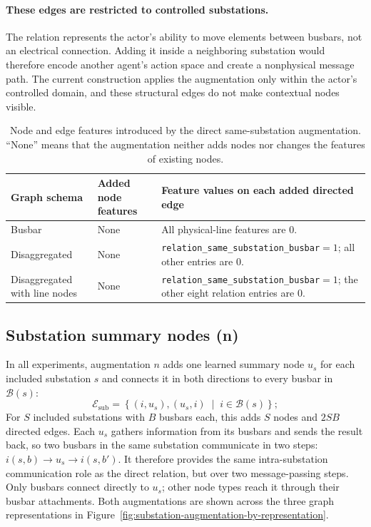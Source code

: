 {\color{clarif}
\paragraph{These edges are restricted to controlled substations.}
The relation represents the actor's ability to move elements between busbars,
not an electrical connection. Adding it inside a neighboring substation would
therefore encode another agent's action space and create a nonphysical message
path. The current construction applies the augmentation only within the actor's
controlled domain, and these structural edges do not make contextual nodes
visible.
}

\begin{table}[H]
  \centering
  \small
  \caption{Node and edge features introduced by the direct same-substation
  augmentation. ``None'' means that the augmentation neither adds nodes nor
  changes the features of existing nodes.}
  \label{tab:same-substation-augmentation-features}
  \setlength{\tabcolsep}{4pt}
  \begin{tabular}{L{0.20\textwidth}L{0.16\textwidth}L{0.54\textwidth}}
    \toprule
    Graph schema & Added node features & Feature values on each added directed edge \\
    \midrule
    Busbar & None & All physical-line features are $0$. \\
    Disaggregated & None & \texttt{relation\_same\_substation\_busbar}$=1$; all other entries are $0$. \\
    Disaggregated with line nodes & None & \texttt{relation\_same\_substation\_busbar}$=1$; the other eight relation entries are $0$. \\
    \bottomrule
  \end{tabular}
\end{table}

\subsection{Substation summary nodes (n)}
\label{sec:substation-summary-nodes}

In all experiments, augmentation $n$ adds one learned summary node $u_s$ for
each included substation $s$ and connects it in both directions to every busbar
in $\mathcal{B}(s)$:
\begin{equation}
  \mathcal{E}_{\mathrm{sub}} =
  \left\{
    (i,u_s),(u_s,i)
    \;\middle|\;
    i\in\mathcal{B}(s)
  \right\};
  \label{eq:substation-node-edges}
\end{equation}
For $S$ included substations with $B$ busbars each, this adds $S$ nodes and
$2SB$ directed edges. Each $u_s$ gathers information from its busbars and sends
the result back, so two busbars in the same substation communicate in two steps:
$i(s,b)\rightarrow u_s\rightarrow i(s,b')$. It therefore provides the same
intra-substation communication role as the direct relation, but over two
message-passing steps. Only busbars connect directly to $u_s$; other node types
reach it through their busbar attachments. Both augmentations are shown across
the three graph representations in
Figure~\ref{fig:substation-augmentation-by-representation}.

